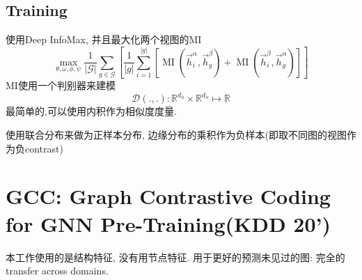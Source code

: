 \documentclass{article}
\begin{document}
\subsection{Training}
\begin{flushleft}
使用Deep InfoMax, 并且最大化两个视图的MI
\begin{equation}
    \max _{\theta, \omega, \phi, \psi} \frac{1}{|\mathcal{G}|} \sum_{g \in \mathcal{G}}\left[\frac{1}{|g|} \sum_{i=1}^{|g|}\left[\operatorname{MI}\left(\vec{h}_{i}^{\alpha}, \vec{h}_{g}^{\beta}\right)+\operatorname{MI}\left(\vec{h}_{i}^{\beta}, \vec{h}_{g}^{\alpha}\right)\right]\right]
\end{equation}
MI使用一个判别器来建模
$$
\mathcal{D}(., .): \mathbb{R}^{d_{h}} \times \mathbb{R}^{d_{h}} \longmapsto \mathbb{R}
$$
最简单的,可以使用内积作为相似度度量.

使用联合分布来做为正样本分布, 边缘分布的乘积作为负样本(即取不同图的视图作为负contrast)

\end{flushleft}

\section{GCC: Graph Contrastive Coding for GNN Pre-Training(KDD 20')}

 本工作使用的是结构特征, 没有用节点特征. 用于更好的预测未见过的图: 完全的transfer across domains.
\end{document}
